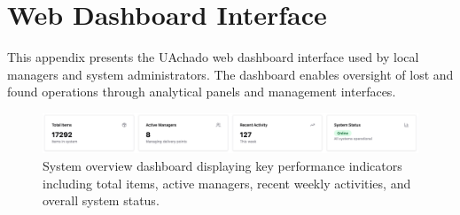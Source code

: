 \chapter{Web Dashboard Interface} \label{app:web_dashboard}

This appendix presents the UAchado web dashboard interface used by local managers and system administrators. The dashboard enables oversight of lost and found operations through analytical panels and management interfaces.

\begin{figure}[h]
    \centering
    \includegraphics[width=\textwidth]{figs/appendix/web/1.png}
    \caption{System overview dashboard displaying key performance indicators including total items, active managers, recent weekly activities, and overall system status.}
    \label{fig:web_dashboard_overview}
\end{figure}

